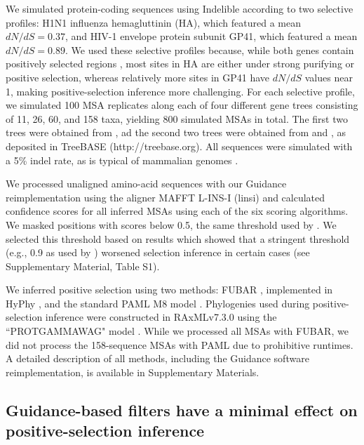 \documentclass[11pt]{article}
\begin{document}
We simulated protein-coding sequences using Indelible \citep{Fletcher2009} according to two selective profiles: H1N1 influenza hemagluttinin (HA), which featured a mean $dN/dS = 0.37$, and HIV-1 envelope protein subunit GP41, which featured a mean $dN/dS = 0.89$. We used these selective profiles because, while both genes contain positively selected regions \citep{Bush1999, Frost2001, Bandawe2008, Meyer2012}, most sites in HA are either under strong purifying or positive selection, whereas relatively more sites in GP41 have $dN/dS$ values near 1, making positive-selection inference more challenging. For each selective profile, we simulated 100 MSA replicates along each of four different gene trees consisting of 11, 26, 60, and 158 taxa, yielding 800 simulated MSAs in total. The first two trees were obtained from \citet{Spielman2013}, ad the second two trees were obtained from \citet{Yang2011} and \citet{Betancur2013}, as deposited in TreeBASE (http://treebase.org). All sequences were simulated with a 5\% indel rate, as is typical of mammalian genomes \citep{Cooper2004}.

We processed unaligned amino-acid sequences with our Guidance reimplementation using the aligner MAFFT L-INS-I (linsi) \citep{Katoh2002,Katoh2005} and calculated confidence scores for all inferred MSAs using each of the six scoring algorithms. We masked positions with scores below 0.5, the same threshold used by \citet{Jordan2012}. We selected this threshold based on results which showed that a stringent threshold (e.g., 0.9 as used by \citealt{Privman2012}) worsened selection inference in certain cases (see Supplementary Material, Table S1).

We inferred positive selection using two methods: FUBAR \citep{Murrell2013}, implemented in HyPhy \citep{Pond2005}, and the standard PAML M8 model \citep{Yang2000, Yang2007}. Phylogenies used during positive-selection inference were constructed in RAxMLv7.3.0 using the ``PROTGAMMAWAG" model \citep{Stamatakis2006}. While we processed all MSAs with FUBAR, we did not process the 158-sequence MSAs with PAML due to prohibitive runtimes. A detailed description of all methods, including the Guidance software reimplementation, is available in Supplementary Materials.


\subsection*{Guidance-based filters have a minimal effect on positive-selection inference}
\end{document}
